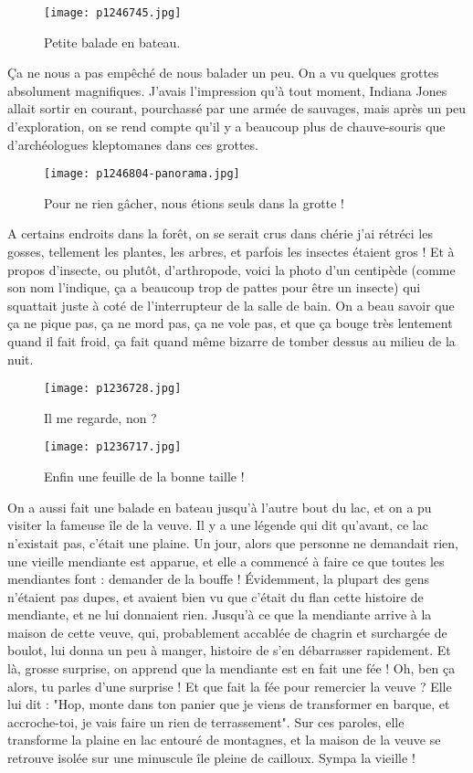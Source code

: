 \documentclass{book}
\begin{document}
\begin{figure}[h]
\centering
\texttt{[image: p1246745.jpg]}
\caption*{Petite balade en bateau.}
\end{figure}

Ça ne nous a pas empêché de nous balader un peu. On a vu quelques grottes absolument magnifiques. J'avais l'impression qu'à tout moment, Indiana Jones allait sortir en courant, pourchassé par une armée de sauvages, mais après un peu d'exploration, on se rend compte qu'il y a beaucoup plus de chauve-souris que d'archéologues kleptomanes dans ces grottes.


\begin{figure}[h]
\centering
\texttt{[image: p1246804-panorama.jpg]}
\caption*{Pour ne rien gâcher, nous étions seuls dans la grotte !}
\end{figure}

A certains endroits dans la forêt, on se serait crus dans chérie j'ai rétréci les gosses, tellement les plantes, les arbres, et parfois les insectes étaient gros ! Et à propos d'insecte, ou plutôt, d'arthropode, voici la photo d'un centipède (comme son nom l'indique, ça a beaucoup trop de pattes pour être un insecte) qui squattait juste à coté de l'interrupteur de la salle de bain. On a beau savoir que ça ne pique pas, ça ne mord pas, ça ne vole pas, et que ça bouge très lentement quand il fait froid, ça fait quand même bizarre de tomber dessus au milieu de la nuit.


\begin{figure}[h]
\centering
\texttt{[image: p1236728.jpg]}
\caption*{Il me regarde, non ?}
\end{figure}


\begin{wrapfigure}{l}{0.55\textwidth}
\centering
\texttt{[image: p1236717.jpg]}
\caption*{Enfin une feuille de la bonne taille !}
\end{wrapfigure}

On a aussi fait une balade en bateau jusqu'à l'autre bout du lac, et on a pu visiter la fameuse île de la veuve. Il y a une légende qui dit qu'avant, ce lac n'existait pas, c'était une plaine. Un jour, alors que personne ne demandait rien, une vieille mendiante est apparue, et elle a commencé à faire ce que toutes les mendiantes font : demander de la bouffe ! Évidemment, la plupart des gens n'étaient pas dupes, et avaient bien vu que c'était du flan cette histoire de mendiante, et ne lui donnaient rien. Jusqu'à ce que la mendiante arrive à la maison de cette veuve, qui, probablement accablée de chagrin et surchargée de boulot, lui donna un peu à manger, histoire de s'en débarrasser rapidement. Et là, grosse surprise, on apprend que la mendiante est en fait une fée ! Oh, ben ça alors, tu parles d'une surprise ! Et que fait la fée pour remercier la veuve ? Elle lui dit : "Hop, monte dans ton panier que je viens de transformer en barque, et accroche-toi, je vais faire un rien de terrassement". Sur ces paroles, elle transforme la plaine en lac entouré de montagnes, et la maison de la veuve se retrouve isolée sur une minuscule île pleine de cailloux. Sympa la vieille !
\end{document}
